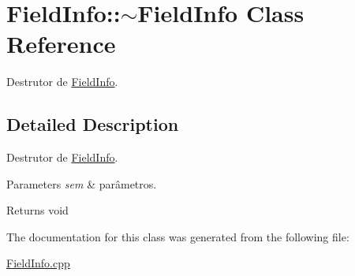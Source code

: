 \hypertarget{class_field_info_1_1~_field_info}{}\section{Field\+Info\+:\+:$\sim$\+Field\+Info Class Reference}
\label{class_field_info_1_1~_field_info}


Destrutor de \hyperlink{class_field_info}{Field\+Info}.  




\subsection{Detailed Description}
Destrutor de \hyperlink{class_field_info}{Field\+Info}. 


\begin{DoxyParams}{Parameters}
{\em sem} & parâmetros. \\
\hline
\end{DoxyParams}
\begin{DoxyReturn}{Returns}
void 
\end{DoxyReturn}


The documentation for this class was generated from the following file\+:\begin{DoxyCompactItemize}
\item 
\hyperlink{_field_info_8cpp}{Field\+Info.\+cpp}\end{DoxyCompactItemize}
